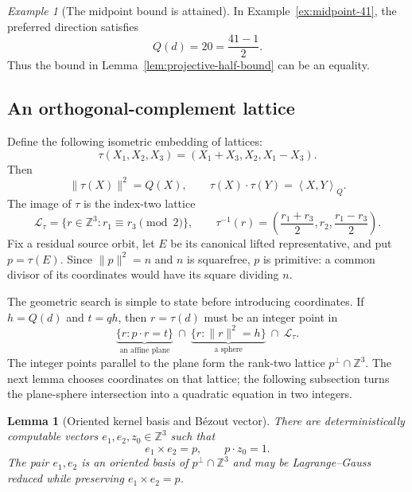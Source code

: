 \documentclass[11pt]{amsart}
\newtheorem{lemma}[theorem]{Lemma}
\theoremstyle{definition}
\theoremstyle{remark}
\newtheorem{example}[theorem]{Example}
\newcommand{\Z}{\mathbb Z}
\newcommand{\Qip}[2]{\left\langle #1,#2\right\rangle_Q}
\begin{document}
\begin{example}[The midpoint bound is attained]
In Example~\ref{ex:midpoint-41}, the preferred direction satisfies
\[
 Q(d)=20=\frac{41-1}{2}.
\]
Thus the bound in Lemma~\ref{lem:projective-half-bound} can be an equality.
\end{example}

\subsection{An orthogonal-complement lattice}

Define the following isometric embedding of lattices:
\[
 \tau(X_1,X_2,X_3)=(X_1+X_3,X_2,X_1-X_3).
\]
Then
\[
 \|\tau(X)\|^2=Q(X),
 \qquad
 \tau(X)\cdot\tau(Y)=\Qip{X}{Y}.
\]
The image of $\tau$ is the index-two lattice
\begin{equation}\label{eq:tau-lattice}
 \mathcal L_\tau=\{r\in\Z^3:r_1\equiv r_3\pmod2\},
 \qquad
 \tau^{-1}(r)=
 \left(\frac{r_1+r_3}{2},r_2,\frac{r_1-r_3}{2}\right).
\end{equation}
Fix a residual source orbit, let $E$ be its canonical lifted representative,
and put $p=\tau(E)$.  Since
$\|p\|^2=n$ and $n$ is squarefree, $p$ is primitive: a common divisor of
its coordinates would have its square dividing $n$.

The geometric search is simple to state before introducing coordinates.  If
$h=Q(d)$ and $t=qh$, then $r=\tau(d)$ must be an integer point in
\begin{equation}\label{eq:plane-sphere}
 \underbrace{\{r:p\cdot r=t\}}_{\text{an affine plane}}
 \ \cap\ 
 \underbrace{\{r:\|r\|^2=h\}}_{\text{a sphere}}
 \ \cap\ \mathcal L_\tau.
\end{equation}
The integer points parallel to the plane form the rank-two lattice
$p^\perp\cap\Z^3$.  The next lemma chooses coordinates on that lattice; the
following subsection turns the plane-sphere intersection into a quadratic
equation in two integers.

\begin{lemma}[Oriented kernel basis and B\'ezout vector]
\label{lem:orthogonal-frame}
There are deterministically computable vectors $e_1,e_2,z_0\in\Z^3$ such that
\[
 e_1\times e_2=p,
 \qquad
 p\cdot z_0=1.
\]
The pair $e_1,e_2$ is an oriented basis of $p^\perp\cap\Z^3$ and may be
Lagrange--Gauss reduced while preserving $e_1\times e_2=p$.
\end{lemma}
\end{document}
